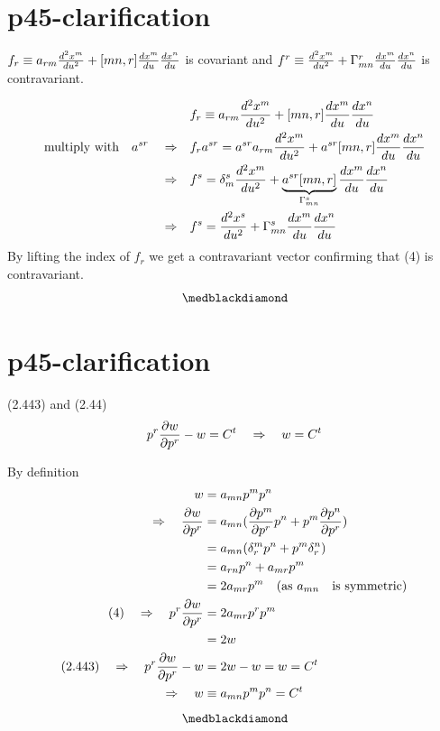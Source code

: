 \section{p45-clarification }
\begin{tcolorbox}
$ f_r \equiv a_{rm}\dv[2]{x^m}{u} +[mn,r]\dv{x^m}{u}\dv{x^n}{u}$ is covariant and 
$ f^r \equiv \dv[2]{x^m}{u} +\Gamma^r_{mn}\dv{x^m}{u}\dv{x^n}{u}$ is contravariant.
\end{tcolorbox}
\begin{align}
\ &f_r \equiv a_{rm}\dv[2]{x^m}{u} +[mn,r]\dv{x^m}{u}\dv{x^n}{u}\\
\text{multiply with}\quad a^{sr}\quad \Rightarrow\quad &f_r a^{sr} = a^{sr}a_{rm}\dv[2]{x^m}{u} +a^{sr}[mn,r]\dv{x^m}{u}\dv{x^n}{u}\\
\Rightarrow\quad &f^{s} = \delta^s_m \dv[2]{x^m}{u} +\underbrace{a^{sr}[mn,r]}_{\Gamma^s_{mn}}\dv{x^m}{u}\dv{x^n}{u}\\
\Rightarrow \quad &f^{s} = \dv[2]{x^s}{u} +\Gamma^s_{mn}\dv{x^m}{u}\dv{x^n}{u}
\end{align}
By lifting the index of $f_r$ we get a contravariant vector confirming that (4) is contravariant.
$$\medblackdiamond$$
\newpage

\section{p45-clarification }
\begin{tcolorbox}
(2.443) and (2.44)
$$ p^r\pdv{w}{p^r} - w = C^t \quad \Rightarrow\quad w = C^t $$ 
\end{tcolorbox}
By definition 
\begin{align}
\ w &= a_{mn}p^mp^n\\
\Rightarrow\quad \pdv{w}{p^r} &= a_{mn}(\pdv{p^m}{p^r}p^n + p^m \pdv{p^n}{p^r})\\
\ &= a_{mn}(\delta^m_rp^n + p^m \delta^n_r)\\
\ &= a_{rn}p^n + a_{mr}p^m \\
\ &= 2a_{mr}p^m \quad\text{(as } a_{mn} \quad \text{is symmetric)}\\
\text{(4)}\quad \Rightarrow \quad p^r\pdv{w}{p^r} &= 2a_{mr}p^rp^m \\
\ &= 2w\\
\text{(2.443)} \quad\Rightarrow\quad p^r\pdv{w}{p^r} -w &= 2w-w = w = C^t\\
\Rightarrow\quad w &\equiv a_{mn}p^mp^n = C^t
\end{align}
$$\medblackdiamond$$
\newpage

